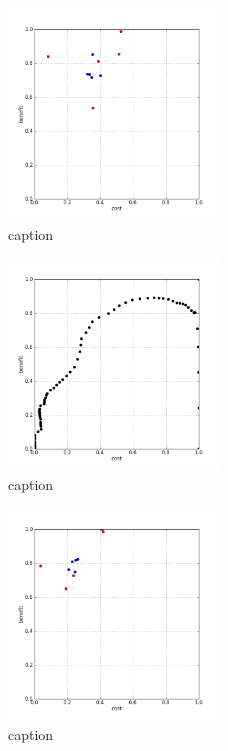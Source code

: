 %
\begin{figure}[!ht]
	\centering
	\includegraphics[width=0.5\textwidth]{img/p1figs/computeFrameStateCubic_sectionCompareBetter_smooth0_tol24.png}
	\caption{caption}
\end{figure}
%
\begin{figure}[!ht]
	\centering
	\includegraphics[width=0.5\textwidth]{img/p1figs/computeFrameStateCubic_sectionCompareBetter_smooth0_tol24_AUC.png}
	\caption{caption}
\end{figure}
%
\begin{figure}[!ht]
	\centering
	\includegraphics[width=0.5\textwidth]{img/p1figs/computeFrameStateCubic_sectionCompareBetter_smooth0_tol48.png}
	\caption{caption}
\end{figure}
